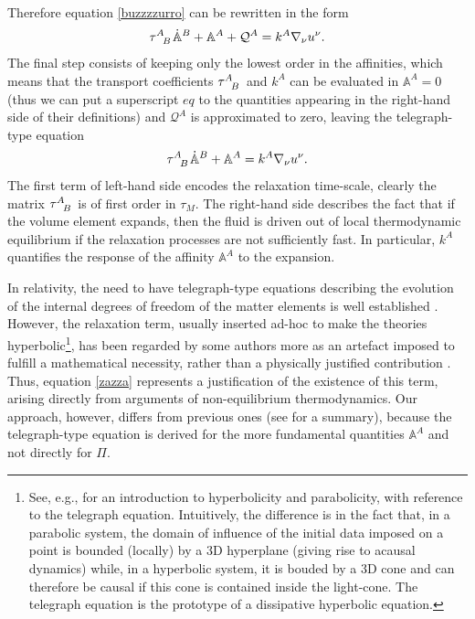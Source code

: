 \documentclass[useAMS,usenatbib,prd,twocolumn,nofootinbib]{revtex4-1}
\begin{document}
Therefore equation \eqref{buzzzzurro} can be rewritten in the form
\begin{equation}
\tau\indices{^A _B} \dot{\mathbb{A}}^B + \mathbb{A}^A + \mathcal{Q}^A = k^A \nabla_\nu u^\nu .
\end{equation}
The final step consists of keeping only the lowest order in the affinities, which means that the transport coefficients $\tau\indices{^A _B}$ and $k^A$ can be evaluated in $\mathbb{A}^A=0$ (thus we can put a superscript $eq$ to the quantities appearing in the right-hand side of their definitions) and $\mathcal{Q}^A$ is approximated to zero, leaving the telegraph-type equation
\begin{equation}\label{zazza}
\tau\indices{^A _B} \dot{\mathbb{A}}^B + \mathbb{A}^A = k^A \nabla_\nu u^\nu .
\end{equation}
The first term of left-hand side encodes the relaxation time-scale, clearly the matrix $\tau\indices{^A _B}$ is of first order in $\tau_M$. The right-hand side describes the fact that if the volume element expands, then the fluid is driven out of local thermodynamic equilibrium if the relaxation processes are not sufficiently fast. In particular, $k^A$ quantifies the response of the affinity $\mathbb{A}^A$ to the expansion.

In relativity, the need to have telegraph-type equations describing the evolution of the internal degrees of freedom of the matter elements is well established \citep{Hiscock_Insatibility_first_order, andersson2007review, rezzolla_book, Lopez11}. However, the relaxation term, usually inserted ad-hoc to make the theories hyperbolic\footnote{See, e.g., \cite{Kost2000} for an
introduction to hyperbolicity and parabolicity, with reference to the telegraph equation. Intuitively, the difference is in the fact that, in a parabolic system, the domain of influence of the initial data imposed on a point is bounded (locally) by a 3D hyperplane (giving rise to acausal dynamics) while, in a hyperbolic system, it is bouded by a 3D cone and can therefore be causal if this cone is contained inside the light-cone. The telegraph equation is the prototype of a dissipative hyperbolic equation. }, has been regarded by some authors more as an artefact imposed to fulfill a mathematical necessity, rather than a physically justified contribution \cite{Geroch95}.  Thus, equation \eqref{zazza}  represents a justification of the existence of this term, arising directly from arguments of non-equilibrium thermodynamics. 
Our approach, however, differs from previous ones (see \cite{Jou_Extended} for a summary), because the telegraph-type equation is derived for the more fundamental quantities $\mathbb{A}^A$ and not directly for $\Pi$.
\end{document}
